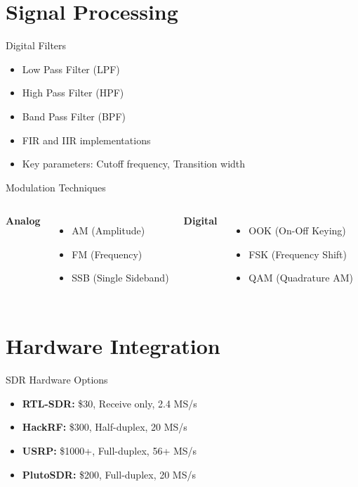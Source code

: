 \documentclass[aspectratio=169,11pt]{beamer}
\begin{document}
\section{Signal Processing}
\begin{frame}{Digital Filters}
\begin{itemize}
    \item Low Pass Filter (LPF)
    \item High Pass Filter (HPF)
    \item Band Pass Filter (BPF)
    \item FIR and IIR implementations
    \item Key parameters: Cutoff frequency, Transition width
\end{itemize}
\end{frame}

\begin{frame}{Modulation Techniques}
\begin{columns}
\textbf{Analog}
\begin{itemize}
    \item AM (Amplitude)
    \item FM (Frequency)
    \item SSB (Single Sideband)
\end{itemize}

\textbf{Digital}
\begin{itemize}
    \item OOK (On-Off Keying)
    \item FSK (Frequency Shift)
    \item QAM (Quadrature AM)
\end{itemize}
\end{columns}
\end{frame}

\section{Hardware Integration}
\begin{frame}{SDR Hardware Options}
\begin{itemize}
    \item \textbf{RTL-SDR:} \$30, Receive only, 2.4 MS/s
    \item \textbf{HackRF:} \$300, Half-duplex, 20 MS/s
    \item \textbf{USRP:} \$1000+, Full-duplex, 56+ MS/s
    \item \textbf{PlutoSDR:} \$200, Full-duplex, 20 MS/s
\end{itemize}
\end{frame}
\end{document}
